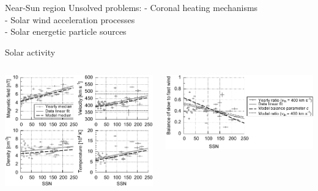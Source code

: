 \begin{frame}[plain,c]{Near-Sun region}{}
	Unsolved problems:	
	- Coronal heating mechanisms\\
	- Solar wind acceleration processes\\
	- Solar energetic particle sources
\end{frame}
\begin{frame}[plain,c]{Solar activity}{}
	\begin{columns}[c]
		
		\includegraphics[width=\textwidth]{../figures_paper/OMNI_yearly_BVNTvsSSN_a.pdf}


		\includegraphics[width=\textwidth]{../figures_paper/Vdbl_SSN_ratio_f_plot.pdf}

	\end{columns}
\end{frame}
